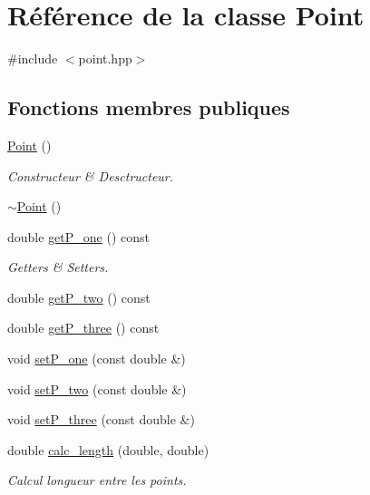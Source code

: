 \hypertarget{class_point}{\section{Référence de la classe Point}
\label{class_point}
}


{\ttfamily \#include $<$point.\-hpp$>$}

\subsection*{Fonctions membres publiques}
\begin{DoxyCompactItemize}
\item 
\hyperlink{class_point_ad92f2337b839a94ce97dcdb439b4325a}{Point} ()
\begin{DoxyCompactList}\small\item\em Constructeur \& Desctructeur. \end{DoxyCompactList}\item 
\hyperlink{class_point_a395fa04b4ec126b66fc053f829a30cc1}{$\sim$\-Point} ()
\item 
double \hyperlink{class_point_a211f8dee098122a2f1c326ba42652ee2}{get\-P\-\_\-one} () const 
\begin{DoxyCompactList}\small\item\em Getters \& Setters. \end{DoxyCompactList}\item 
double \hyperlink{class_point_afd9ee8dca2913903fd6a1a95d743afaa}{get\-P\-\_\-two} () const 
\item 
double \hyperlink{class_point_adf0f89d9beca24315b45d96786896a56}{get\-P\-\_\-three} () const 
\item 
void \hyperlink{class_point_aea96dfedc04450f20928929fc1357ba6}{set\-P\-\_\-one} (const double \&)
\item 
void \hyperlink{class_point_a282784b2c6669e5270b9ec447f6e9dc1}{set\-P\-\_\-two} (const double \&)
\item 
void \hyperlink{class_point_aa46638c8c613fa6192272d4a4168f503}{set\-P\-\_\-three} (const double \&)
\item 
double \hyperlink{class_point_a5cb059b4e16aca7ca375076971d90521}{calc\-\_\-length} (double, double)
\begin{DoxyCompactList}\small\item\em Calcul longueur entre les points. \end{DoxyCompactList}\end{DoxyCompactItemize}


